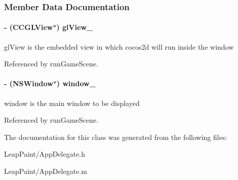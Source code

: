 \subsubsection{Member Data Documentation}
\hypertarget{interface_app_delegate_a5f256d1ae550f33820c6730d70088694}{
\paragraph[{gl\-View\-\_\-}]{\setlength{\rightskip}{0pt plus 5cm}-\/ (C\-C\-G\-L\-View$\ast$) gl\-View\-\_\-\hspace{0.3cm}{\ttfamily [protected]}}}\label{dd/d52/interface_app_delegate_a5f256d1ae550f33820c6730d70088694}
gl\-View is the embedded view in which cocos2d will run inside the window 

Referenced by run\-Game\-Scene.

\hypertarget{interface_app_delegate_a5338c82d195ce50c948cbbf1b974665b}{
\paragraph[{window\-\_\-}]{\setlength{\rightskip}{0pt plus 5cm}-\/ (N\-S\-Window$\ast$) window\-\_\-\hspace{0.3cm}{\ttfamily [protected]}}}\label{dd/d52/interface_app_delegate_a5338c82d195ce50c948cbbf1b974665b}
window is the main window to be displayed 

Referenced by run\-Game\-Scene.



The documentation for this class was generated from the following files\-:\begin{DoxyCompactItemize}
\item 
Leap\-Paint/App\-Delegate.\-h\item 
Leap\-Paint/App\-Delegate.\-m\end{DoxyCompactItemize}
